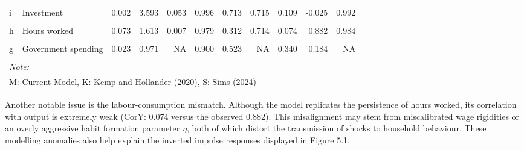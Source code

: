 \documentclass[11pt,preprint]{elsarticle}
\let\origtable\table
\let\endorigtable\endtable
\renewenvironment{table}[1][2] {
    \expandafter\origtable\expandafter[H]
} {
    \endorigtable
}
\numberwithin{equation}{section}
\numberwithin{figure}{section}
\numberwithin{table}{section}
\begin{document}
\begin{table}[!h]
{\begin{tabular}[t]{llrrrrrrrrr}
\addlinespace
i & Investment & 0.002 & 3.593 & 0.053 & 0.996 & 0.713 & 0.715 & 0.109 & -0.025 & 0.992\\
\cellcolor{gray!10}{w} & \cellcolor{gray!10}{Real wage} & \cellcolor{gray!10}{0.147} & \cellcolor{gray!10}{1.802} & \cellcolor{gray!10}{0.010} & \cellcolor{gray!10}{0.979} & \cellcolor{gray!10}{0.186} & \cellcolor{gray!10}{0.739} & \cellcolor{gray!10}{0.076} & \cellcolor{gray!10}{0.128} & \cellcolor{gray!10}{0.992}\\
h & Hours worked & 0.073 & 1.613 & 0.007 & 0.979 & 0.312 & 0.714 & 0.074 & 0.882 & 0.984\\
\cellcolor{gray!10}{K} & \cellcolor{gray!10}{Capital} & \cellcolor{gray!10}{0.002} & \cellcolor{gray!10}{NA} & \cellcolor{gray!10}{NA} & \cellcolor{gray!10}{1.000} & \cellcolor{gray!10}{NA} & \cellcolor{gray!10}{NA} & \cellcolor{gray!10}{0.068} & \cellcolor{gray!10}{NA} & \cellcolor{gray!10}{NA}\\
g & Government spending & 0.023 & 0.971 & NA & 0.900 & 0.523 & NA & 0.340 & 0.184 & NA\\
\addlinespace
\cellcolor{gray!10}{tau} & \cellcolor{gray!10}{Taxes} & \cellcolor{gray!10}{0.023} & \cellcolor{gray!10}{NA} & \cellcolor{gray!10}{NA} & \cellcolor{gray!10}{0.900} & \cellcolor{gray!10}{NA} & \cellcolor{gray!10}{NA} & \cellcolor{gray!10}{0.000} & \cellcolor{gray!10}{NA} & \cellcolor{gray!10}{NA}\\
\bottomrule
\multicolumn{11}{l}{\rule{0pt}{1em}\textit{Note:}}\\
\multicolumn{11}{l}{\rule{0pt}{1em}M: Current Model, K: Kemp and Hollander (2020), S: Sims (2024)}\\
\end{tabular}}
\end{table}

Another notable issue is the labour-consumption mismatch. Although the
model replicates the persistence of hours worked, its correlation with
output is extremely weak (CorY: 0.074 versus the observed 0.882). This
misalignment may stem from miscalibrated wage rigidities or an overly
aggressive habit formation parameter \(\eta\), both of which distort the
transmission of shocks to household behaviour. These modelling anomalies
also help explain the inverted impulse responses displayed in Figure
5.1.
\end{document}
